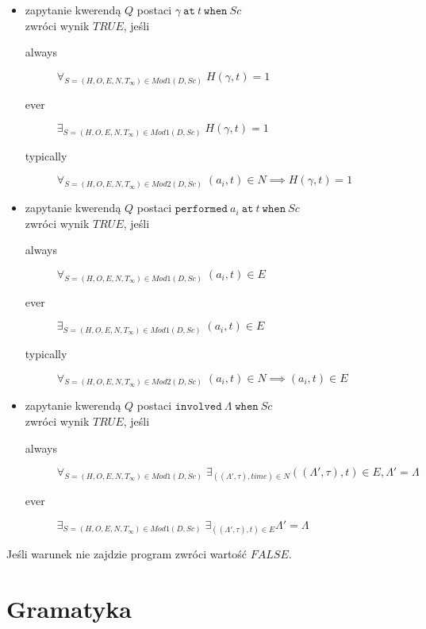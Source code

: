 \begin{itemize}
	\item zapytanie kwerendą $Q$ postaci $\gamma\ \texttt{at}\ t\ \texttt{when}\ Sc$\\ zwróci wynik $TRUE$, jeśli\\
	\begin{description}
		\item[always] $\forall_{S=(H,O,E,N,T_{\infty}) \in Mod1(D, Sc)}\; H(\gamma,t)=1$
		\item[ever] $\exists_{S=(H,O,E,N,T_{\infty}) \in Mod1(D, Sc)}\; H(\gamma,t)=1$
		\item[typically] $\forall_{S=(H,O,E,N,T_{\infty}) \in Mod2(D, Sc)}\; (a_i, t) \in N \implies H(\gamma,t)=1$
	\end{description}
	\item zapytanie kwerendą $Q$ postaci $\texttt{performed}\ a_i\ \texttt{at}\ t\ \texttt{when}\ Sc$\\
	zwróci wynik $TRUE$, jeśli
	\begin{description}
		\item[always] $\forall_{S=(H,O,E,N,T_{\infty}) \in Mod1(D, Sc)}\; (a_i,t) \in E$
		\item[ever] $\exists_{S=(H,O,E,N,T_{\infty}) \in Mod1(D, Sc)}\; (a_i,t) \in E$
		\item[typically] $\forall_{S=(H,O,E,N,T_{\infty}) \in Mod2(D, Sc)}\; (a_i,t) \in N \implies (a_i,t) \in E$
	\end{description}
	\item zapytanie kwerendą $Q$ postaci $\texttt{involved}\ \Lambda \; \texttt{when}\ Sc$\\ zwróci wynik $TRUE$, jeśli
	\begin{description}
		\item[always] $\forall_{S=(H,O,E,N,T_{\infty}) \in Mod1(D, Sc)}\; \exists_{((\Lambda', \tau), time) \in N} ((\Lambda', \tau),t) \in E, \Lambda' = \Lambda$
		\item[ever] $\exists_{S=(H,O,E,N,T_{\infty}) \in Mod1(D, Sc)}\; \exists_{((\Lambda', \tau),t) \in E} \Lambda' = \Lambda$
	\end{description}
\end{itemize}

\begin{remark}
   Jeśli warunek nie zajdzie program zwróci wartość $FALSE$.
\end{remark}
\section{Gramatyka}


\begin{example}~\\

\end{example}


